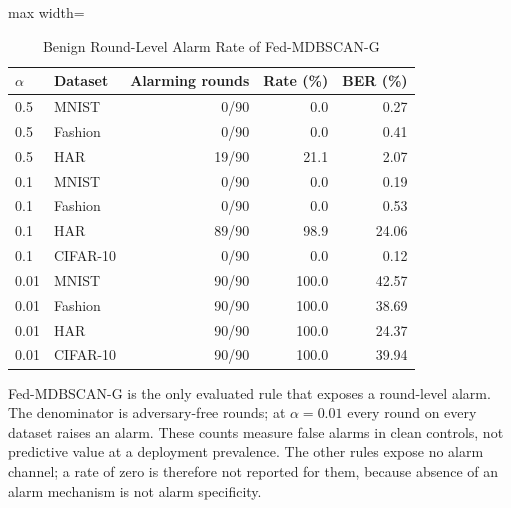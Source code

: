 \begin{table}[!t]
\centering\footnotesize
\setlength{\tabcolsep}{4pt}
\caption{Benign Round-Level Alarm Rate of Fed-MDBSCAN-G}\label{tab:alarm}
\begin{adjustbox}{max width=\columnwidth}
\begin{tabular}{llrrr}
\toprule
$\alpha$ & Dataset & Alarming rounds & Rate (\%) & BER (\%) \\
\midrule
0.5 & MNIST & 0/90 & 0.0 & 0.27 \\
0.5 & Fashion & 0/90 & 0.0 & 0.41 \\
0.5 & HAR & 19/90 & 21.1 & 2.07 \\
0.1 & MNIST & 0/90 & 0.0 & 0.19 \\
0.1 & Fashion & 0/90 & 0.0 & 0.53 \\
0.1 & HAR & 89/90 & 98.9 & 24.06 \\
0.1 & CIFAR-10 & 0/90 & 0.0 & 0.12 \\
0.01 & MNIST & 90/90 & 100.0 & 42.57 \\
0.01 & Fashion & 90/90 & 100.0 & 38.69 \\
0.01 & HAR & 90/90 & 100.0 & 24.37 \\
0.01 & CIFAR-10 & 90/90 & 100.0 & 39.94 \\
\bottomrule
\end{tabular}
\end{adjustbox}

\par\vspace{3pt}\parbox{\linewidth}{\footnotesize Fed-MDBSCAN-G is the only evaluated rule that exposes a round-level alarm. The denominator is adversary-free rounds; at $\alpha=0.01$ every round on every dataset raises an alarm. These counts measure false alarms in clean controls, not predictive value at a deployment prevalence. The other rules expose no alarm channel; a rate of zero is therefore not reported for them, because absence of an alarm mechanism is not alarm specificity.}
\end{table}
